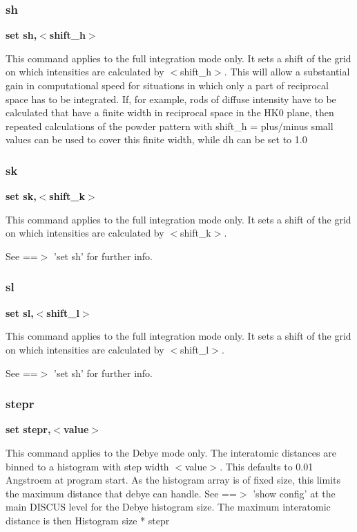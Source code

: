 \subsubsection{sh}
{\bf set sh,$ <$shift\_h$> $ \par }
\par
\vspace{3pt}
This command applies to the full integration mode only. 
It sets a shift of the grid on which intensities are calculated by 
$ <$shift\_h$> $. 
This will allow a substantial gain in computational speed for 
situations in which only a part of reciprocal space has to 
be integrated. If, for example, rods of diffuse intensity have to 
be calculated that have a finite width in reciprocal space in the 
HK0 plane, then repeated calculations of the powder pattern with 
shift\_h = plus/minus small values can be used to cover this finite 
width, while dh can be set to 1.0 
\subsubsection{sk}
{\bf set sk,$ <$shift\_k$> $ \par }
\par
\vspace{3pt}
This command applies to the full integration mode only. 
It sets a shift of the grid on which intensities are calculated by 
$ <$shift\_k$> $. 
\par
See ==$> $ 'set sh' for further info. 
\subsubsection{sl}
{\bf set sl,$ <$shift\_l$> $ \par }
\par
\vspace{3pt}
This command applies to the full integration mode only. 
It sets a shift of the grid on which intensities are calculated by 
$ <$shift\_l$> $. 
\par
See ==$> $ 'set sh' for further info. 
\subsubsection{stepr}
{\bf set stepr,$ <$value$> $ \par }
\par
\vspace{3pt}
This command applies to the Debye mode only. 
The interatomic distances are binned to a histogram with step width 
$ <$value$> $. This defaults to 0.01 Angstroem at program start. 
As the histogram array is of fixed size, this limits the maximum 
distance that debye can handle. See ==$> $ 'show config' at the main 
DISCUS level for the Debye histogram size. The maximum interatomic 
distance is then 
Histogram size * stepr 
